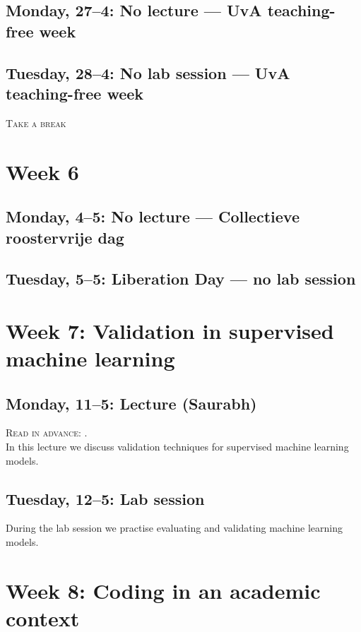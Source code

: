 \subsection*{Monday, 27--4: No lecture --- UvA teaching-free week}
\subsection*{Tuesday, 28--4: No lab session --- UvA teaching-free week}

\textsc{ Take a break}

\section*{Week 6}

\subsection*{Monday, 4--5: No lecture --- Collectieve roostervrije dag}
\subsection*{Tuesday, 5--5: Liberation Day --- no lab session}

\section*{Week 7: Validation in supervised machine learning}

\subsection*{Monday, 11--5: Lecture (Saurabh)}

\textsc{ Read in advance: \cite{birkenmaier_search_2023}.}\\

In this lecture we discuss validation techniques for supervised machine learning models.

\subsection*{Tuesday, 12--5: Lab session}

During the lab session we practise evaluating and validating machine learning models.

\section*{Week 8: Coding in an academic context}

